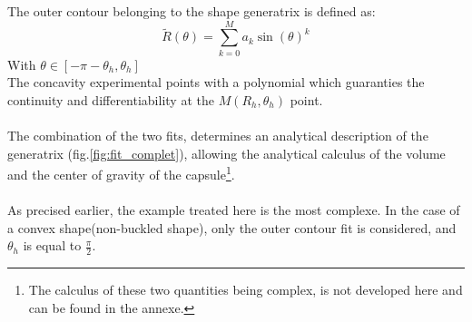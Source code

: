 The outer contour belonging to the shape generatrix is defined as:
\begin{equation*}
	\tilde{R}(\theta) = \sum\limits_{k=0}^M a_k \sin(\theta)^k
\end{equation*}
With $\theta \in[-\pi-\theta_h,\theta_h]$\\
The concavity experimental points with a polynomial which guaranties the continuity and differentiability at the $M(R_{h},\theta_h)$ point.
\paragraph{}
The combination of the two fits, determines an analytical description of the generatrix (fig.\ref{fig:fit_complet}), allowing the analytical calculus of the volume and the center of gravity of the capsule\footnote{The calculus of these two quantities being complex, is not developed here and can be found in the annexe.}. 
\paragraph{}
As precised earlier, the example treated here is the most complexe. In the case of a convex shape(non-buckled shape), only the outer contour fit is considered, and $\theta_h$ is equal to $\frac{\pi}{2}$.
